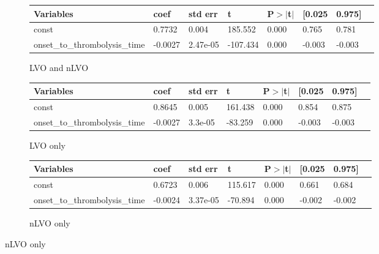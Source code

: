 \begin{figure}[!h]
    \begin{subfigure}[b]{1\textwidth}
    \centering
        \begin{tabular}{llllllll}
        \toprule
        Variables & coef & std err & t & P$>$$|$t$|$ & [0.025 & 0.975] \\ \midrule
        const  & 0.7732 & 0.004 & 185.552 & 0.000 & 0.765 & 0.781\\
        onset\_to\_thrombolysis\_time & -0.0027 & 2.47e-05 & -107.434 & 0.000 & -0.003 & -0.003\\
        \bottomrule
        \end{tabular}
      \caption{LVO and nLVO}
      \label{fig:stats_table_lvo_nlvo}
    \end{subfigure}

    \vspace{15mm}
    \begin{subfigure}[b]{1\textwidth}
      \centering    
        \begin{tabular}{llllllll}
        \toprule
        Variables & coef & std err & t & P$>$$|$t$|$ & [0.025 & 0.975] \\ \midrule
        const    &                      0.8645  &    0.005 &   161.438  &    0.000    &   0.854   &    0.875\\
        onset\_to\_thrombolysis\_time   & -0.0027  &  3.3e-05 &   -83.259  &    0.000   &   -0.003    &  -0.003\\
        \bottomrule
        \end{tabular}
      \caption{LVO only}
      \label{fig:stats_table_lvo}
    \end{subfigure}

    \vspace{15mm}
    \begin{subfigure}[b]{1\textwidth}
      \centering
       \begin{tabular}{llllllll}
        \toprule
        Variables & coef & std err & t & P$>$$|$t$|$ & [0.025 & 0.975] \\ \midrule
        const                   &       0.6723 &     0.006 &   115.617 &     0.000 &      0.661  &     0.684\\
        onset\_to\_thrombolysis\_time  &  -0.0024 &  3.37e-05 &   -70.894  &    0.000 &     -0.002  &    -0.002\\
        \bottomrule
        \end{tabular}
        \caption{nLVO only}
      \label{fig:stats_table_nlvo}
    \end{subfigure}
    \label{fig:stats_table}
\end{figure}











